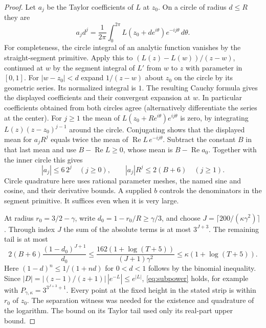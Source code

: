 \begin{proof}
Let $a_j$ be the Taylor coefficients of $L$ at $z_0$. On a circle of
radius $d\le R$ they are
\[
 a_jd^j=\frac1{2\pi}\int_0^{2\pi}
                L(z_0+d e^{i\theta})e^{-ij\theta}\,d\theta .
\]
For completeness, the circle integral of an analytic function vanishes
by the straight-segment primitive. Apply this to
$(L(z)-L(w))/(z-w)$, continued at $w$ by the segment integral of
$L'$ from $w$ to $z$ with parameter in $[0,1]$. For $|w-z_0|<d$
expand $1/(z-w)$ about $z_0$ on the circle by its geometric series.
Its normalized integral is $1$. The resulting Cauchy formula gives
the displayed coefficients and their convergent expansion at $w$.
In particular coefficients obtained from both circles agree
(alternatively differentiate the series at the center).
For $j\ge1$ the mean of $L(z_0+R e^{i\theta})e^{ij\theta}$ is zero,
by integrating $L(z)(z-z_0)^{j-1}$ around the circle.
Conjugating shows that the displayed mean for $a_jR^j$ equals
twice the mean of $\operatorname{Re}L\,e^{-ij\theta}$.
Subtract the constant $B$ in that last mean and use
$B-\operatorname{Re} L\ge0$, whose mean is $B-\operatorname{Re}a_0$.
Together with the inner circle this gives
\[
       |a_j|\le 6\,2^j\quad(j\ge0),\qquad
       |a_j|R^j\le2(B+6)\quad(j\ge1).
\]
Circle quadrature here uses rational parameter meshes, the named
sine and cosine, and their derivative bounds. A supplied $b$ controls
the denominators in the segment primitive. It suffices even when
it is very large.

At radius $r_0=3/2-\gamma$, write $d_0=1-r_0/R\ge\gamma/3$,
and choose $J=\lceil200/(\kappa\gamma^2)\rceil$. Through index
$J$ the sum of the absolute terms is at most $3^{J+3}$.
The remaining tail is at most
\[
   2(B+6)\frac{(1-d_0)^{J+1}}{d_0}
    \le \frac{162(1+\log(T+5))}{(J+1)\gamma^2}
    \le \kappa(1+\log(T+5)).
\]
Here $(1-d)^n\le1/(1+nd)$ for $0<d<1$ follows by the binomial
inequality. Since $|D|=|(z-1)/(z+1)|\,|e^{-L}|\le e^{|L|}$,
\eqref{eq:subpower} holds, for example with
$P_{\gamma,\kappa}=3^{3^{J+3}+1}$. Every point at the fixed height
in the stated strip is within $r_0$ of $z_0$. The separation witness
was needed for the existence and quadrature of the logarithm. The
bound on its Taylor tail used only its real-part upper bound.


\end{proof}
